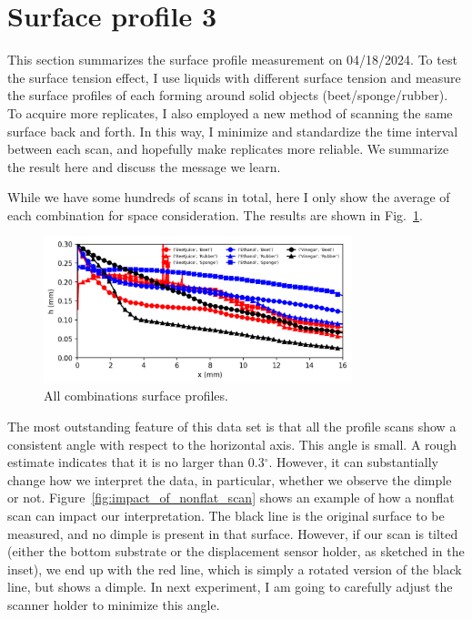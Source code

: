 \documentclass[12pt]{article}
\begin{document}
\section{Surface profile 3}

This section summarizes the surface profile measurement on 04/18/2024. To test the surface tension effect, I use liquids with different surface tension and measure the surface profiles of each forming around solid objects (beet/sponge/rubber). To acquire more replicates, I also employed a new method of scanning the same surface back and forth. In this way, I minimize and standardize the time interval between each scan, and hopefully make replicates more reliable. We summarize the result here and discuss the message we learn. 

While we have some hundreds of scans in total, here I only show the average of each combination for space consideration. The results are shown in Fig.~\ref{fig:different-liquid-all-in-one_04182024}. 

\begin{figure}
    \centering
    \includegraphics[width=0.8\textwidth]{Figures/different-liquid-all-in-one_04182024.pdf}
    \caption{All combinations surface profiles.}
    \label{fig:different-liquid-all-in-one_04182024}
\end{figure}

The most outstanding feature of this data set is that all the profile scans show a consistent angle with respect to the horizontal axis. This angle is small. A rough estimate indicates that it is no larger than 0.3$^\circ$. However, it can substantially change how we interpret the data, in particular, whether we observe the dimple or not. Figure~\ref{fig:impact_of_nonflat_scan} shows an example of how a nonflat scan can impact our interpretation. The black line is the original surface to be measured, and no dimple is present in that surface. However, if our scan is tilted (either the bottom substrate or the displacement sensor holder, as sketched in the inset), we end up with the red line, which is simply a rotated version of the black line, but shows a dimple. In next experiment, I am going to carefully adjust the scanner holder to minimize this angle.
\end{document}
